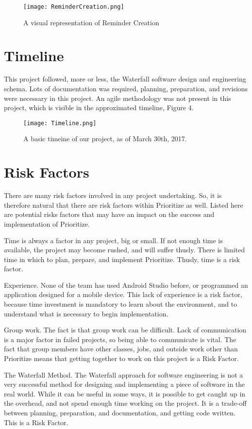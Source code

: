\documentclass[12pt]{article}
\begin{document}
\begin{figure}[h]
\texttt{[image: ReminderCreation.png]}
\centering
\caption{A visual representation of Reminder Creation}
\end{figure}

\section{Timeline}

This project followed, more or less, the Waterfall software design and engineering schema. Lots of documentation was required, planning, preparation, and revisions were necessary in this project. An agile methodology was not present in this project, which is visible in the approximated timeline, Figure 4.

\begin{figure}[h]
\texttt{[image: Timeline.png]}
\centering
\caption{A basic timeine of our project, as of March 30th, 2017.}
\end{figure}


\section{Risk Factors}
There are many risk factors involved in any project undertaking. So, it is therefore natural that there are risk factors within Prioritize as well. Listed here are potential risks factors that may have an impact on the success and implementation of Prioritize.

Time is always a factor in any project, big or small. If not enough time is available, the project may become rushed, and will suffer thusly. There is limited time in which to plan, prepare, and implement Prioritize. Thusly, time is a risk factor.

Experience. None of the team has used Android Studio before, or programmed an application designed for a mobile device. This lack of experience is a risk factor, because time investment is mandatory to learn about the environment, and to understand what is necessary to begin implementation.

Group work. The fact is that group work can be difficult. Lack of communication is a major factor in failed projects, so being able to communicate is vital. The fact that group members have other classes, jobs, and outside work other than Prioritize means that getting together to work on this project is a Risk Factor. 

The Waterfall Method. The Waterfall approach for software engineering is not a very successful method for designing and implementing a piece of software in the real world. While it can be useful in some ways, it is possible to get caught up in the overhead, and not spend enough time working on the project. It is a trade-off between planning, preparation, and documentation, and getting code written. This is a Risk Factor.
\end{document}
